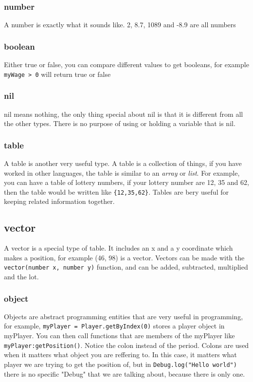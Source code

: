 \documentclass{book}
\begin{document}
\subsubsection{number}
A number is exactly what it sounds like. 2, 8.7, 1089 and -8.9 are all numbers

\subsubsection{boolean}
Either true or false, you can compare different values to get booleans, for example \texttt{myWage > 0} will return true or false

\subsubsection{nil}
nil means nothing, the only thing special about nil is that it is different from all the other types. There is no purpose of using or holding a variable that is nil.

\subsubsection{table}
A table is another very useful type. A table is a collection of things, if you have worked in other languages, the table is similar to an \textit{array} or \textit{list}. For example, you can have a table of lottery numbers, if your lottery number are 12, 35 and 62, then the table would be written like \texttt{\{12,35,62\}}. Tables are bery useful for keeping related information together.

\subsection{vector}
A vector is a special type of table. It includes an x and a y coordinate which makes a position, for example (46, 98) is a vector. Vectors can be made with the \texttt{vector(number x, number y)} function, and can be added, subtracted, multiplied and the lot.

\subsubsection{object}
Objects are abstract programming entities that are very useful in programming, for example, \texttt{myPlayer = Player.getByIndex(0)} stores a player object in myPlayer. You can then call functions that are members of the myPlayer like \texttt{myPlayer:getPosition()}. Notice the colon instead of the period. Colons are used when it matters what object you are reffering to. In this case, it matters what player we are trying to get the position of, but in \texttt{Debug.log("Hello world")} there is no specific "Debug" that we are talking about, because there is only one.
\end{document}
